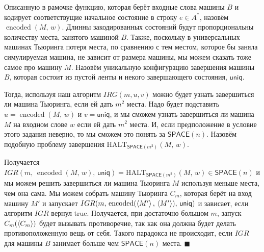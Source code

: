 \documentclass{article}
\begin{document}
  Описанную в рамочке функцию, которая берёт входные слова машины $B$ и кодирует соответствущие начальное состояние в строку $e \in A^*$, назовём $\operatorname{encoded}(M,\, w)$.
  Длинны закодированных состояний будут пропорциональны количеству места, занятого машиной $B$.
  Также, поскольку в универсальных машинах Тьюринга потеря места, по сравнению с тем местом, которое бы заняла симулируемая машина, не зависит от размера машины, мы можем сказать тоже самое про машину $M$.
  Назовём уникальную конфигурацию завершения машины $B$, которая состоит из пустой ленты и некого завершающего состояния, $\mathsf{uniq}$.

  Тогда, используя наш алгоритм $IRG(m, u, v)$ можно будет узнать завершиться ли машина Тьюринга, если ей дать $m^2$ места.
  Надо будет подставить $u = \operatorname{encoded}(M,\, w)$ и $v = \mathsf{uniq}$, и мы сможем узнать завершиться ли машина $M$ на входном слове $w$ если ей дать $m^2$ места.
  И, если предположение в условие этого задания неверно, то мы сможем это понять за $\mathsf{SPACE}(n)$.
  Назовём подобную проблему завершения $\mathrm{HALT}_{\mathsf{SPACE}(m^2)}(M,\, w)$.

  Получается $IGR(m,\, \operatorname{encoded}(M,\, w),\, \mathsf{uniq}) = \mathrm{HALT}_{\mathsf{SPACE}(m^2)}(M,\, w) \in \mathsf{SPACE}(n)$ и мы можем решить завершиться ли машина Тьюринга $M$ используя меньше места, чем она сама.
  Мы можем собрать машину Тьюринга $C_m$, которая берёт на вход машину $M'$ и запускает $IGR(m,\, \operatorname{encoded}(\left<M'\right>,\, \left<M'\right>),\, \mathsf{uniq})$ и зависает, если алгоритм $IGR$ вернул true.
  Получается, при достаточно большом $m$, запуск $C_m(\left<C_m\right>)$ будет вызывать противоречие, так как она должна будет делать противоположенную вещь от себя. Такого парадокса не происходит, если $IGR$ для машины $B$ занимает больше чем $\mathsf{SPACE}(n)$ места.
  $\blacksquare$
\end{document}
